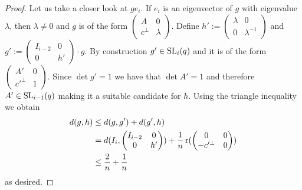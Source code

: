 \begin{proof}
	Let us take a closer look at $ge_i$. If $e_i$ is an eigenvector of $g$ with eigenvalue $\lambda$, then $\lambda\not=0$ and $g$ is of the form 
	$\begin{pmatrix}
		A      & 0       \\
		c^\bot & \lambda 
	\end{pmatrix}$.
	Define $h':=
	\begin{pmatrix}
		\lambda & 0            \\
		0       & \lambda^{-1} 
	\end{pmatrix}
	$
	and $g':=
	\begin{pmatrix}
		I_{i-2} & 0  \\
		0       & h' 
	\end{pmatrix}\cdot g$.
	By construction $g'\in\operatorname{SL}_i(q)$ and it is of the form 
	$\begin{pmatrix}
		A'      & 0 \\
		c'^\bot & 1 
	\end{pmatrix}$. Since $\det g'=1$ we have that $\det A'=1$ and therefore $A'\in\operatorname{SL}_{i-1}(q)$ making it a suitable candidate for $h$. Using the triangle inequality we obtain
	\begin{align*}
		d(g,h)   & \leq d(g,g')+d(g',h)          \\
		         & =d(I_i,\begin{pmatrix}        
		I_{i-2}  & 0                             \\
		0        & h'                            
		\end{pmatrix})+\frac{1}{n}\operatorname{r}(\begin{pmatrix}
		0        & 0                             \\
		-c'^\bot & 0                             
		\end{pmatrix})\\
		         & \leq \frac{2}{n}+ \frac{1}{n} 
	\end{align*}
	as desired.
				

\end{proof}
